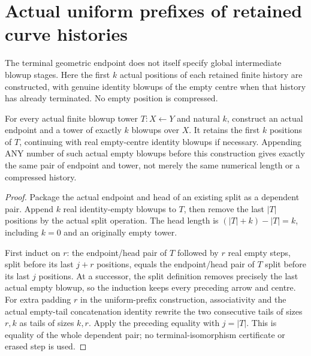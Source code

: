 \section{Actual uniform prefixes of retained curve histories}

The terminal geometric endpoint does not itself specify global intermediate
blowup stages. Here the first $k$ actual positions of each retained finite
history are constructed, with genuine identity blowups of the empty centre
when that history has already terminated. No empty position is compressed.

\begin{theorem}
\label{hir:sharp-actual-curve-uniform-prefix-padding}
\leanok
For every actual finite blowup tower $T:X\leftarrow Y$ and natural $k$,
construct an actual endpoint and a tower of exactly $k$ blowups over $X$.
It retains the first $k$ positions of $T$, continuing with real empty-centre
identity blowups if necessary. Appending ANY number of such actual empty
blowups before this construction gives exactly the same pair of endpoint
and tower, not merely the same numerical length or a compressed history.
\end{theorem}
\begin{proof}
Package the actual endpoint and head of an existing split as a dependent
pair. Append $k$ real identity-empty blowups to $T$, then remove the last
$|T|$ positions by the actual split operation. The head length is
$(|T|+k)-|T|=k$, including $k=0$ and an originally empty tower.

First induct on $r$: the endpoint/head pair of $T$ followed by $r$ real
empty steps, split before its last $j+r$ positions, equals the endpoint/head
pair of $T$ split before its last $j$ positions. At a successor, the split
definition removes precisely the last actual empty blowup, so the induction
keeps every preceding arrow and centre. For extra padding $r$ in the
uniform-prefix construction, associativity and the actual empty-tail
concatenation identity rewrite the two consecutive tails of sizes $r,k$
as tails of sizes $k,r$. Apply the preceding equality with $j=|T|$.
This is equality of the whole dependent pair; no terminal-isomorphism
certificate or erased step is used.
\end{proof}

